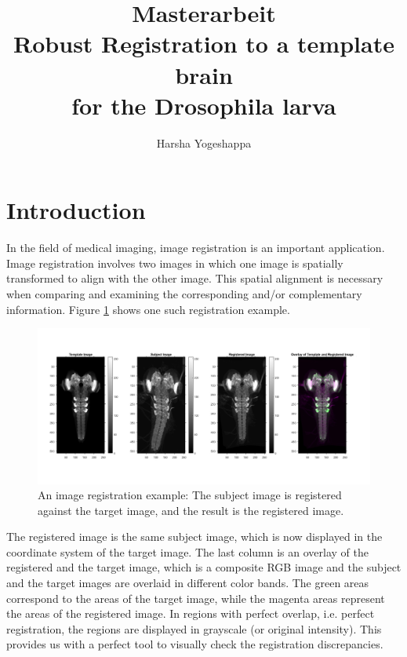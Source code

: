 \documentclass{article}
\title{
	Masterarbeit \\
	Robust Registration to a template brain  \\
	for the Drosophila larva \large }
\author{Harsha Yogeshappa}
\begin{document}
	\maketitle
	\newpage
	
	\hypersetup{linkcolor=rwth-blue-1}
	\tableofcontents
	\newpage
	\section{Introduction}
	In the field of medical imaging, image registration is an important application. Image registration involves two images in which one image is spatially transformed to align with the other image. This spatial alignment is necessary when comparing and examining the corresponding and/or complementary information. Figure \ref{fig:Registraion} shows one such registration example. \newline
		
	\begin{figure}[H]
		\centering
		\includegraphics[width=\linewidth]{resources/introduction_fig_1.jpg}
		\caption{An image registration example: The subject image is registered against the target image, and the result is the registered image.}
		\label{fig:Registraion}
	\end{figure}

	The registered image is the same subject image, which is now displayed in the coordinate system of the target image. The last column is an overlay of the registered and the target image, which is a composite RGB image and the subject and the target images are overlaid in different color bands. The green areas correspond to the areas of the target image, while the magenta areas represent the areas of the registered image. In regions with perfect overlap, i.e. perfect registration, the regions are displayed in grayscale (or original intensity). This provides us with a perfect tool to visually check the registration discrepancies. \newline
			
\end{document}
